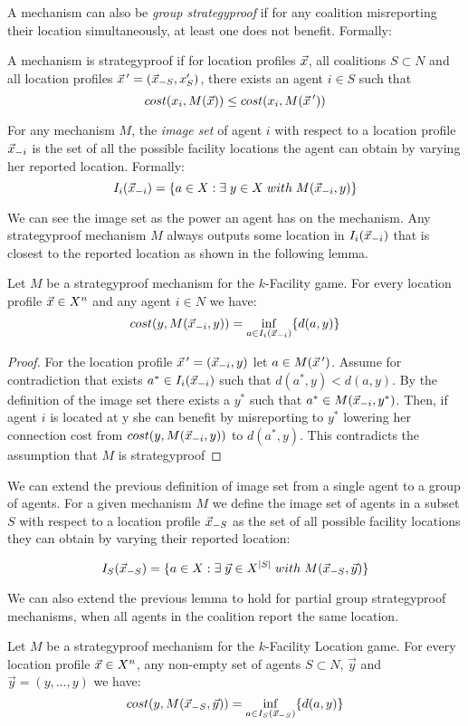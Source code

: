 A mechanism can also be \emph{group strategyproof} if for any coalition misreporting their location simultaneously, at least one does not benefit. Formally: 
 
\begin{definition}
A mechanism is strategyproof if for location profiles $\vec{x}$, all coalitions $S \subset N$ and all location profiles $\vec{x}\,' = (\vec{x}_{-S},x_S')$, there exists an agent $i\in S$ such that
\[ cost(x_i,M(\vec{x})) \le cost(x_i,M(\vec{x}\,'))\]
\end{definition}

\begin{definition}\label{imageSet}
For any mechanism $M$, the \emph{image set} of agent $i$ with respect to a location profile $\vec{x}_{-i}$ is the set of all the possible facility locations the agent can obtain by varying her reported location. Formally:
\[ I_i(\vec{x}_{-i}) = \{a \in  X: \exists \;y \in X \; with \; M(\vec{x}_{-i},y)\}\]
\end{definition}

We can see the image set as the power an agent has on the mechanism. Any strategyproof mechanism $M$ always outputs some location in $I_i(\vec{x}_{-i})$ that is closest to the reported location as shown in the following lemma.

\begin{lemma}\label{imageSetLemma}
Let $M$ be a strategyproof mechanism for the $k$-Facility game. For every location profile $\vec{x} \in X^n$ and any agent $i\in N$ we have:
\[ cost(y,M(\vec{x}_{-i},y)) = \inf_{a\in I_i(\vec{x}_{-i})} \{d(a,y)\}\]
\end{lemma}

\begin{proof}
For the location profile $\vec{x}\,'=(\vec{x}_{-i},y)$ let $a\in M(\vec{x}\,')$. Assume for contradiction that exists $a^*\in I_i(\vec{x}_{-i})$ such that $d(a^*,y) < d(a,y)$. By the definition of the image set there exists a $y^*$ such that $a^* \in M(\vec{x}_{-i},y^*)$. Then, if agent $i$ is located at y she can benefit by misreporting to $y^*$ lowering her connection cost from $cost(y, M(\vec{x}_{-i},y))$ to $d(a^*,y)$. This contradicts the assumption that $M$ is strategyproof
\end{proof}

We can extend the previous definition of image set from a single agent to a group of agents. For a given mechanism $M$ we define the image set of agents in a subset $S$ with respect to a location profile $\vec{x}_{-S}$ as the set of all possible facility locations they can obtain by varying their reported location:

\[ I_S(\vec{x}_{-S}) = \{a \in X: \exists\;\vec{y} \in X^{|S|} \; with \; M(\vec{x}_{-S},\vec{y})\}\]

We can also extend the previous lemma to hold for partial group strategyproof mechanisms, when all agents in the coalition report the same location.
\begin{lemma}
Let $M$ be a strategyproof mechanism for the $k$-Facility Location game. For every location profile $\vec{x} \in X^n$, any non-empty set of agents $S\subset N$, $\vec{y}$ and $\vec{y}=(y,...,y)$ we have:
\[ cost(y,M(\vec{x}_{-S},\vec{y})) = \inf_{a\in I_S(\vec{x}_{-S})} \{d(a,y)\}\]
\end{lemma}

